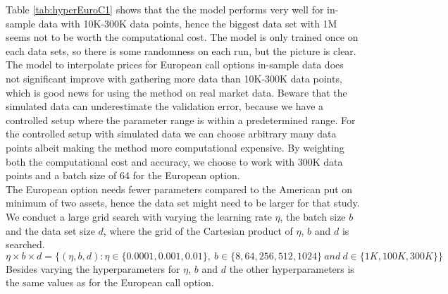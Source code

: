 Table \ref{tab:hyperEuroC1} shows that the the model performs very well for in-sample data with 10K-300K data points, hence the biggest data set with 1M seems not to be worth the computational cost. The model is only trained once on each data sets, so there is some randomness on each run, but the picture is clear. The model to interpolate prices for European call options in-sample data does not significant improve with gathering more data than 10K-300K data points, which is good news for using the method on real market data.  Beware that the simulated data can underestimate the validation error, because we have a controlled setup where the parameter range is within a predetermined range. For the controlled setup with simulated data we can choose arbitrary many data points albeit making the method more computational expensive. By weighting both the computational cost and accuracy, we choose to work with 300K data points and a batch size of 64 for the European option. \\

The European option needs fewer parameters compared to the American put on minimum of two assets, hence the data set might need to be larger for that study. We conduct a large grid search with varying the learning rate $\eta$, the batch size $b$ and the data set size $d$, where the grid of the Cartesian product of $\eta$, $b$ and $d$ is searched.
$$\eta \times b \times d = \{(\eta,b, d) : \eta \in \{0.0001, 0.001, 0.01 \}, \ b \in \{8, 64, 256, 512, 1024\} \ and \ d \in\{1K,100K,300K \} \}$$
Besides varying the hyperparameters for $\eta$, $b$ and $d$ the other hyperparameters is the same values as for the European call option.\\


